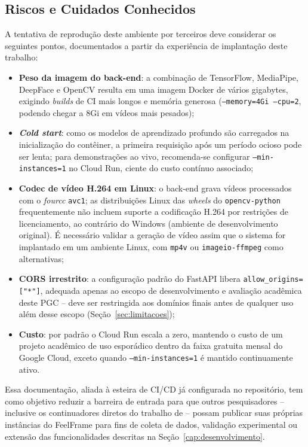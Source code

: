 \documentclass[
	12pt,
	openright,
	oneside,
	a4paper,
	english,
	brazil
	]{abntex2}
\begin{document}
\begin{apendicesenv}
\section{Riscos e Cuidados Conhecidos}

A tentativa de reprodução deste ambiente por terceiros deve considerar os seguintes pontos, documentados a partir da experiência de implantação deste trabalho:

\begin{itemize}
    \item \textbf{Peso da imagem do back-end}: a combinação de TensorFlow, MediaPipe, DeepFace e OpenCV resulta em uma imagem Docker de vários gigabytes, exigindo \textit{builds} de CI mais longos e memória generosa (\texttt{--memory=4Gi --cpu=2}, podendo chegar a 8Gi em vídeos mais pesados);
    \item \textbf{\textit{Cold start}}: como os modelos de aprendizado profundo são carregados na inicialização do contêiner, a primeira requisição após um período ocioso pode ser lenta; para demonstrações ao vivo, recomenda-se configurar \texttt{--min-instances=1} no Cloud Run, ciente do custo contínuo associado;
    \item \textbf{Codec de vídeo H.264 em Linux}: o back-end grava vídeos processados com o \textit{fourcc} \texttt{avc1}; as distribuições Linux das \textit{wheels} do \texttt{opencv-python} frequentemente não incluem suporte a codificação H.264 por restrições de licenciamento, ao contrário do Windows (ambiente de desenvolvimento original). É necessário validar a geração de vídeo assim que o sistema for implantado em um ambiente Linux, com \texttt{mp4v} ou \texttt{imageio-ffmpeg} como alternativas;
    \item \textbf{CORS irrestrito}: a configuração padrão do FastAPI libera \texttt{allow\_origins=["*"]}, adequada apenas ao escopo de desenvolvimento e avaliação acadêmica deste PGC -- deve ser restringida aos domínios finais antes de qualquer uso além desse escopo (Seção~\ref{sec:limitacoes});
    \item \textbf{Custo}: por padrão o Cloud Run escala a zero, mantendo o custo de um projeto acadêmico de uso esporádico dentro da faixa gratuita mensal do Google Cloud, exceto quando \texttt{--min-instances=1} é mantido continuamente ativo.
\end{itemize}

Essa documentação, aliada à esteira de CI/CD já configurada no repositório, tem como objetivo reduzir a barreira de entrada para que outros pesquisadores -- inclusive os continuadores diretos do trabalho de \cite{nascimento2024nelson} -- possam publicar suas próprias instâncias do FeelFrame para fins de coleta de dados, validação experimental ou extensão das funcionalidades descritas na Seção~\ref{cap:desenvolvimento}.

\end{apendicesenv}
\end{document}
